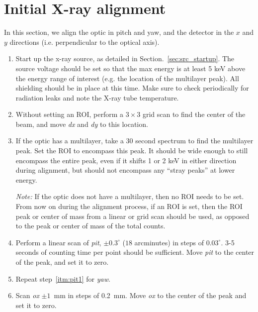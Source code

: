 \section{Initial X-ray alignment\label{sec:xrayalign}}

In this section, we align the optic in pitch and yaw, and the detector in the
$x$ and $y$ directions (i.e. perpendicular to the optical axis).

\begin{enumerate}

\item Start up the x-ray source, as detailed in
  Section.~\ref{sec:src_startup}. The source voltage should be set so that the
  max energy is at least 5 keV above the energy range of interest (e.g. the
  location of the multilayer peak). All shielding should be in place at this
  time. Make sure to check periodically for radiation leaks and note the X-ray
  tube temperature.

\item Without setting an ROI, perform a $3\times3$ grid scan to find the center
  of the beam, and move \textit{dx} and \textit{dy} to this location.

\item If the optic has a multilayer, take a 30 second spectrum to find the
  multilayer peak. Set the ROI to encompass this peak. It should be wide enough
  to still encompass the entire peak, even if it shifts 1 or 2 keV in either
  direction during alignment, but should not encompass any ``stray peaks'' at
  lower energy.

\textit{Note:} If the optic does not have a multilayer, then no ROI needs to be
set. From now on during the alignment process, if an ROI is set, then the ROI
peak or center of mass from a linear or grid scan should be used, as opposed to
the peak or center of mass of the total counts.

\item \label{itm:pit1} Perform a linear scan of \textit{pit}, $\pm 0.3 ^\circ$
  ($18$ arcminutes) in steps of $0.03^\circ$. 3-5 seconds of counting time per
  point should be sufficient. Move \textit{pit} to the center of the peak, and
  set it to zero.

\item \label{itm:yaw1} Repeat step~\ref{itm:pit1} for \textit{yaw}.

\item \label{itm:ox1} Scan \textit{ox} $\pm 1$~mm in steps of 0.2~mm. Move
  \textit{ox} to the center of the peak and set it to zero.


\end{enumerate}
